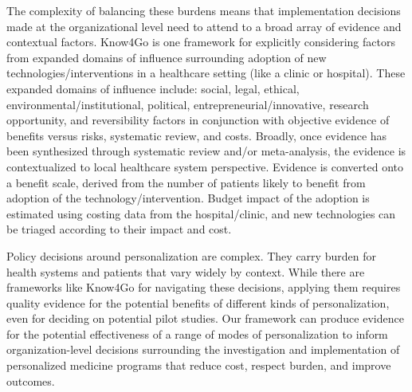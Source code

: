 The complexity of balancing these burdens means that implementation decisions made at the organizational level need to attend to a broad array of evidence and contextual factors. Know4Go \cite{martin2016hospital} is one framework for explicitly considering factors from expanded domains of influence surrounding adoption of new technologies/interventions in a healthcare setting (like a clinic or hospital). These expanded domains of influence include: social, legal, ethical, environmental/institutional, political, entrepreneurial/innovative, research opportunity, and reversibility factors in conjunction with objective evidence of benefits versus risks, systematic review, and costs.  Broadly, once evidence has been synthesized through systematic review and/or meta-analysis, the evidence is contextualized to local healthcare system perspective.  Evidence is converted onto a benefit scale, derived from the number of patients likely to benefit from adoption of the technology/intervention.  Budget impact of the adoption is estimated using costing data from the hospital/clinic, and new technologies can be triaged according to their impact and cost.  

Policy decisions around personalization are complex. They carry burden for health systems and patients that vary widely by context. While there are frameworks like Know4Go for navigating these decisions, applying them requires quality evidence for the potential benefits of different kinds of personalization, even for deciding on potential pilot studies. Our framework can produce evidence for the potential effectiveness of a range of modes of personalization to inform organization-level decisions surrounding the investigation and implementation of personalized medicine programs that reduce cost, respect burden, and improve outcomes.


